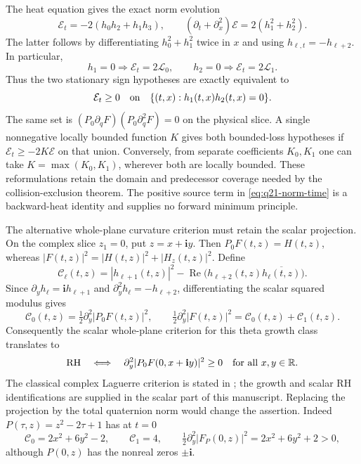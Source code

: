 \documentclass[11pt]{article}
\numberwithin{equation}{section}
\theoremstyle{definition}
\theoremstyle{remark}
\newcommand{\Lag}{\mathscr L}
\begin{document}
The heat equation gives the exact norm evolution
\begin{equation}
 \mathcal E_t=-2(h_0h_2+h_1h_3),\qquad
 (\partial_t+\partial_x^2)\mathcal E=2(h_1^2+h_2^2).
 \label{eq:q21-norm-time}
\end{equation}
The latter follows by differentiating \(h_0^2+h_1^2\) twice in
\(x\) and using \(h_{\ell,t}=-h_{\ell+2}\).
In particular,
\begin{equation}
 h_1=0\Longrightarrow\mathcal E_t=2\Lag_0,
 \qquad
 h_2=0\Longrightarrow\mathcal E_t=2\Lag_1.
 \label{eq:q21-stationary-norm}
\end{equation}
Thus the two stationary sign hypotheses are exactly equivalent to
\begin{equation}
 \mathcal E_t\ge0\quad\hbox{on}\quad
 \{(t,x):h_1(t,x)h_2(t,x)=0\}.
 \label{eq:q21-stationary-union}
\end{equation}
The same set is
\((P_0\partial_qF)(P_0\partial_q^2F)=0\) on the physical slice.
A single nonnegative locally bounded function \(K\) gives both
bounded-loss hypotheses if
\(\mathcal E_t\ge-2K\mathcal E\) on that union.
Conversely, from separate coefficients \(K_0,K_1\) one can take
\(K=\max(K_0,K_1)\), wherever both are locally bounded.
These reformulations retain the domain and predecessor coverage needed
by the collision-exclusion theorem. The positive source term in
\eqref{eq:q21-norm-time} is a backward-heat identity and supplies no
forward minimum principle.

The alternative whole-plane curvature criterion must retain the scalar
projection. On the complex slice \(z_1=0\), put \(z=x+\mathbf iy\).
Then \(P_0F(t,z)=H(t,z)\), whereas
\(|F(t,z)|^2=|H(t,z)|^2+|H_z(t,z)|^2\). Define
\[
 \mathcal C_\ell(t,z)
 =|h_{\ell+1}(t,z)|^2
   -\operatorname{Re}\bigl(h_{\ell+2}(t,z)\overline{h_\ell(t,z)}\bigr).
\]
Since \(\partial_yh_\ell=\mathbf i h_{\ell+1}\) and
\(\partial_y^2h_\ell=-h_{\ell+2}\), differentiating the scalar squared
modulus gives
\begin{equation}
 \mathcal C_0(t,z)=\tfrac12\partial_y^2|P_0F(t,z)|^2,
 \qquad
 \tfrac12\partial_y^2|F(t,z)|^2
       =\mathcal C_0(t,z)+\mathcal C_1(t,z).
 \label{eq:q21-projected-curvature}
\end{equation}
Consequently the scalar whole-plane criterion for this theta growth
class translates to
\begin{equation}
 \mathrm{RH}\quad\Longleftrightarrow\quad
 \partial_y^2|P_0F(0,x+\mathbf iy)|^2\ge0
       \quad\hbox{for all }x,y\in\mathbb R.
 \label{eq:q21-rh-projected-curvature}
\end{equation}
The classical complex Laguerre criterion is stated in
\cite[Theorem~2.4]{csordasescassut}; the growth and scalar RH
identifications are supplied in the scalar part of this manuscript.
Replacing the projection by the total quaternion norm would change
the assertion. Indeed \(P(\tau,z)=z^2-2\tau+1\) has at \(t=0\)
\[
 \mathcal C_0=2x^2+6y^2-2,\qquad
 \mathcal C_1=4,\qquad
 \tfrac12\partial_y^2|F_P(0,z)|^2=2x^2+6y^2+2>0,
\]
although \(P(0,z)\) has the nonreal zeros \(\pm\mathbf i\).
\end{document}
